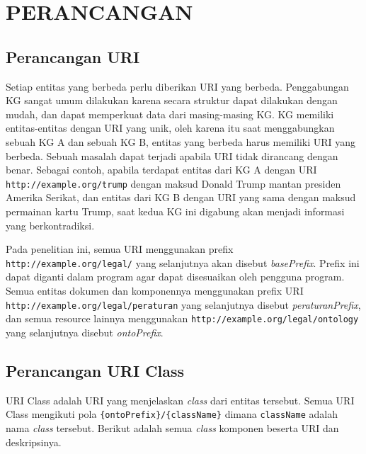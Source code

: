 \chapter{PERANCANGAN}
\label{bab:4}

\section{Perancangan URI}\label{perancangan-uri}

Setiap entitas yang berbeda perlu diberikan URI yang berbeda. Penggabungan KG sangat umum dilakukan
karena secara struktur dapat dilakukan dengan mudah, dan dapat memperkuat data dari masing-masing
KG. KG memiliki entitas-entitas dengan URI yang unik, oleh karena itu saat menggabungkan sebuah KG A
dan sebuah KG B, entitas yang berbeda harus memiliki URI yang berbeda. Sebuah masalah dapat terjadi
apabila URI tidak dirancang dengan benar. Sebagai contoh, apabila terdapat entitas dari KG A dengan
URI \texttt{http://example.org/trump} dengan maksud Donald Trump mantan presiden Amerika Serikat,
dan entitas dari KG B dengan URI yang sama dengan maksud permainan kartu Trump, saat kedua KG ini
digabung akan menjadi informasi yang berkontradiksi.

Pada penelitian ini, semua URI menggunakan prefix \texttt{http://example.org/legal/} yang
selanjutnya akan disebut \textit{basePrefix}. Prefix ini dapat diganti dalam program agar dapat
disesuaikan oleh pengguna program. Semua entitas dokumen dan komponennya menggunakan prefix URI
\texttt{http://example.org/legal/peraturan} yang selanjutnya disebut \textit{peraturanPrefix}, dan
semua resource lainnya menggunakan \texttt{http://example.org/legal/ontology} yang selanjutnya
disebut \textit{ontoPrefix}.

\section{Perancangan URI Class}\label{perancangan-uri-class}

URI Class adalah URI yang menjelaskan \textit{class} dari entitas tersebut. Semua URI Class mengikuti
pola \texttt{\{ontoPrefix\}/\{className\}} dimana \texttt{className} adalah nama \textit{class}
tersebut. Berikut adalah semua \textit{class} komponen beserta URI dan deskripsinya.

